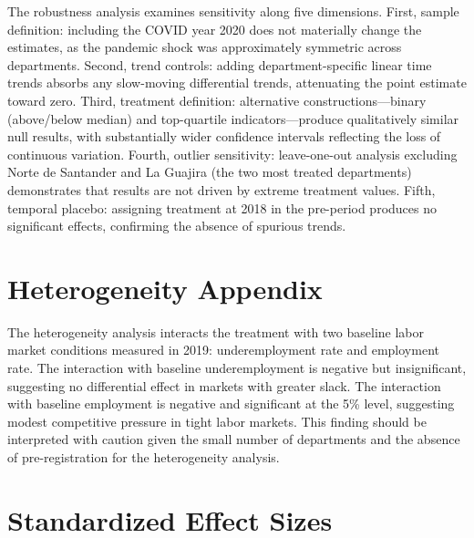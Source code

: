 \documentclass[12pt]{article}
\begin{document}
The robustness analysis examines sensitivity along five dimensions. First, sample definition: including the COVID year 2020 does not materially change the estimates, as the pandemic shock was approximately symmetric across departments. Second, trend controls: adding department-specific linear time trends absorbs any slow-moving differential trends, attenuating the point estimate toward zero. Third, treatment definition: alternative constructions---binary (above/below median) and top-quartile indicators---produce qualitatively similar null results, with substantially wider confidence intervals reflecting the loss of continuous variation. Fourth, outlier sensitivity: leave-one-out analysis excluding Norte de Santander and La Guajira (the two most treated departments) demonstrates that results are not driven by extreme treatment values. Fifth, temporal placebo: assigning treatment at 2018 in the pre-period produces no significant effects, confirming the absence of spurious trends.

\section{Heterogeneity Appendix}
\label{sec:hetero_appendix}

The heterogeneity analysis interacts the treatment with two baseline labor market conditions measured in 2019: underemployment rate and employment rate. The interaction with baseline underemployment is negative but insignificant, suggesting no differential effect in markets with greater slack. The interaction with baseline employment is negative and significant at the 5\% level, suggesting modest competitive pressure in tight labor markets. This finding should be interpreted with caution given the small number of departments and the absence of pre-registration for the heterogeneity analysis.

\section{Standardized Effect Sizes}
\label{sec:sde}


\end{document}
